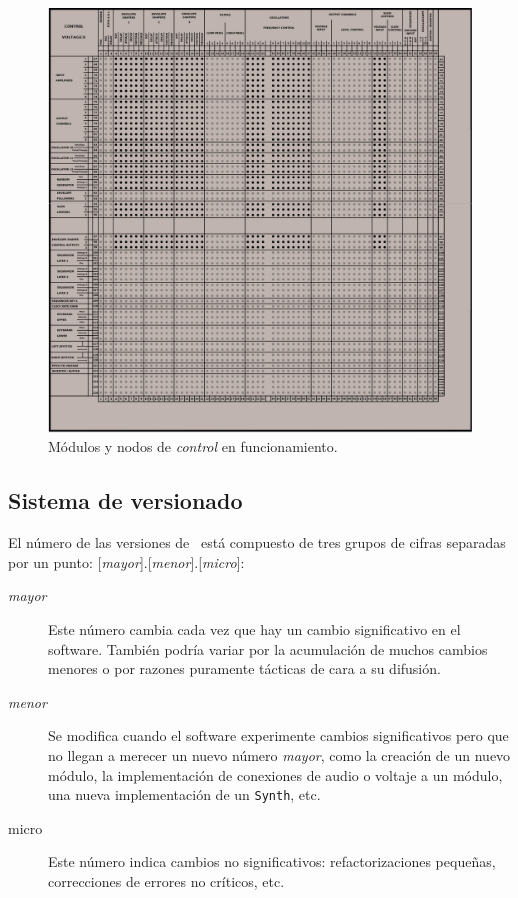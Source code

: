 \begin{figure}
	\centering
	\includegraphics[width=1\textwidth]{nodos_enabled_control}
	\caption[Módulos y nodos de \textit{control} en funcionamiento]{Módulos y nodos de \textit{control} en funcionamiento.}
	\label{fig:nodos_enabled_control}
\end{figure}

\subsection{Sistema de versionado}

El número de las versiones de \appName~está compuesto de tres grupos de cifras separadas por un punto: [\textit{mayor}].[\textit{menor}].[\textit{micro}]:

\begin{description} 
	\item[\textit{mayor}] Este número cambia cada vez que hay un cambio significativo en el software.  También podría variar por la acumulación de muchos cambios menores o por razones puramente tácticas de cara a su difusión.
	\item[\textit{menor}] Se modifica cuando el software experimente cambios significativos pero que no llegan a merecer un nuevo número \textit{mayor}, como la creación de un nuevo módulo, la implementación de conexiones de audio o voltaje a un módulo, una nueva implementación de un \texttt{Synth}, etc.
	\item[micro] Este número indica cambios no significativos: refactorizaciones pequeñas, correcciones de errores no críticos, etc.
\end{description}

